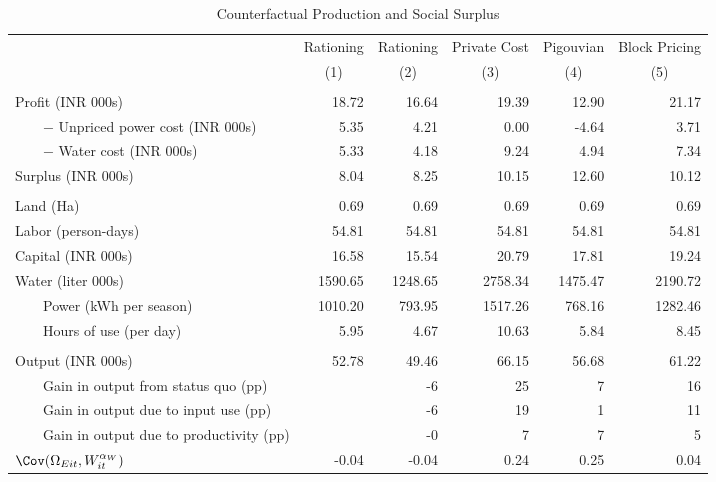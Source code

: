 \begin{table}[!ht]
	\centering
		\caption{Counterfactual Production and Social Surplus\label{tab:cfOutcomes}}
\begin{tabular}{lrrrrr}
		\toprule
               &Rationing&Rationing&Private Cost&Pigouvian&Block Pricing\\
&\multicolumn{1}{c}{(1)}&\multicolumn{1}{c}{(2)}&\multicolumn{1}{c}{(3)}&\multicolumn{1}{c}{(4)}&\multicolumn{1}{c}{(5)}\\
		\midrule
		 \addlinespace 
\multicolumn{6}{c}{\emph{A. Profits and social surplus}}\\
		 \addlinespace 
		Profit (INR 000s)&18.72&16.64&19.39&12.90&21.17\\
		~~~~$-$ Unpriced power cost (INR 000s)&5.35&4.21&0.00&-4.64&3.71\\
		~~~~$-$ Water cost (INR 000s)&5.33&4.18&9.24&4.94&7.34\\
\cmidrule(lr){1-1}		Surplus (INR 000s)&8.04&8.25&10.15&12.60&10.12\\
		 \addlinespace 
\multicolumn{6}{c}{\emph{B. Input use}}\\
		 \addlinespace 
		      Land (Ha)&0.69&0.69&0.69&0.69&0.69\\
		Labor (person-days)&54.81&54.81&54.81&54.81&54.81\\
		Capital (INR 000s)&16.58&15.54&20.79&17.81&19.24\\
		Water (liter 000s)&1590.65&1248.65&2758.34&1475.47&2190.72\\
		~~~~Power (kWh per season)&1010.20&793.95&1517.26&768.16&1282.46\\
		~~~~Hours of use (per day)&5.95&4.67&10.63&5.84&8.45\\
		 \addlinespace 
\multicolumn{6}{c}{\emph{C. Output and productivity}}\\
		 \addlinespace 
		Output (INR 000s)&52.78&49.46&66.15&56.68&61.22\\
		~~~~Gain in output from status quo (pp)&&  -6&  25&   7&  16\\
		~~~~Gain in output due to input use (pp)&&  -6&  19&   1&  11\\
		~~~~Gain in output due to productivity (pp)&&  -0&   7&   7&   5\\
		$\Cov(\Omega_{Eit},W_{it}^{\alpha_W})$&-0.04&-0.04&0.24&0.25&0.04\\
		\bottomrule

\end{tabular}
\end{table}
